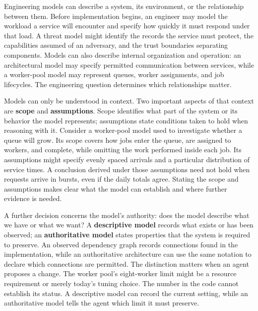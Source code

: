 Engineering models can describe a system, its environment, or the relationship between them. Before implementation begins, an engineer may model the workload a service will encounter and specify how quickly it must respond under that load. A threat model might identify the records the service must protect, the capabilities assumed of an adversary, and the trust boundaries separating components. Models can also describe internal organization and operation: an architectural model may specify permitted communication between services, while a worker-pool model may represent queues, worker assignments, and job lifecycles. The engineering question determines which relationships matter.


Models can only be understood in context. Two important aspects of that context are \textbf{scope} and \textbf{assumptions}. Scope identifies what part of the system or its behavior the model represents; assumptions state conditions taken to hold when reasoning with it. Consider a worker-pool model used to investigate whether a queue will grow. Its scope covers how jobs enter the queue, are assigned to workers, and complete, while omitting the work performed inside each job. Its assumptions might specify evenly spaced arrivals and a particular distribution of service times. A conclusion derived under those assumptions need not hold when requests arrive in bursts, even if the daily totals agree. Stating the scope and assumptions makes clear what the model can establish and where further evidence is needed.


A further decision concerns the model’s authority: does the model describe what we have or what we want? A \textbf{descriptive model} records what exists or has been observed; an \textbf{authoritative model} states properties that the system is required to preserve. An observed dependency graph records connections found in the implementation, while an authoritative architecture can use the same notation to declare which connections are permitted. The distinction matters when an agent proposes a change. The worker pool’s eight-worker limit might be a resource requirement or merely today’s tuning choice. The number in the code cannot establish its status. A descriptive model can record the current setting, while an authoritative model tells the agent which limit it must preserve.

